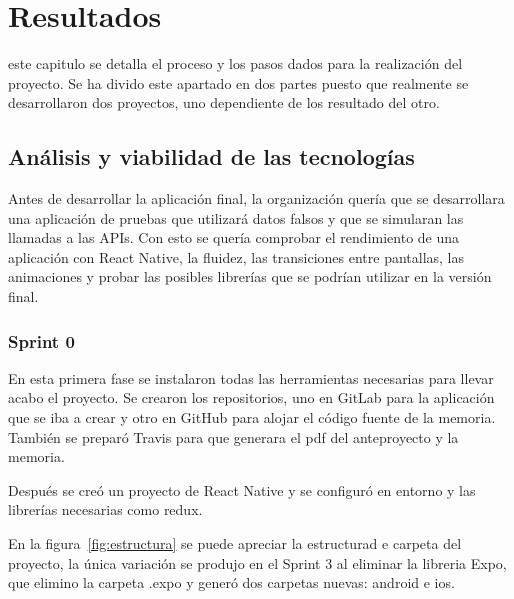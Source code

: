 \chapter{Resultados}
\label{chap:resultados}

 este capitulo se detalla el proceso y los pasos dados para la realización del 
proyecto. Se ha divido este apartado en dos partes puesto que realmente se 
desarrollaron dos proyectos, uno dependiente de los resultado del otro. 

\section{Análisis y viabilidad de las tecnologías}

Antes de desarrollar la aplicación final, la organización quería que se desarrollara una 
aplicación de pruebas que utilizará datos falsos y que se simularan las llamadas a las APIs. Con 
esto se quería comprobar el rendimiento de una aplicación con React Native, la fluidez, las 
transiciones entre pantallas, las animaciones y probar las posibles librerías que se 
podrían utilizar en la versión final.

\subsection{Sprint 0}

En esta primera fase se instalaron todas las herramientas necesarias para llevar acabo el 
proyecto. Se crearon los repositorios, uno en GitLab para la aplicación que se iba 
a crear y otro en GitHub para alojar el código fuente de la memoria. También se 
preparó Travis para que generara el pdf del anteproyecto y la memoria.

Después se creó un proyecto de React Native y se configuró en entorno y  las librerías 
necesarias como redux.

En la figura~\ref{fig:estructura} se puede apreciar la estructurad e carpeta del proyecto, la 
única variación se produjo en el Sprint 3 al eliminar la libreria Expo, que elimino la carpeta
.expo y generó dos carpetas nuevas: android e ios.

